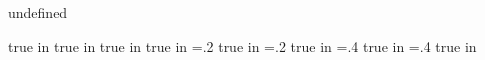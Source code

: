 \def\ifundefined#1{\expandafter\ifx\csname#1\endcsname\relax}
\def\ifdefined#1{\ifundefined{#1}\relax\else}
{\ifdefined{undefined}\fi}
\ifx\eplain\undefined  \fi 

\ifpdf
     true in
     true in
\fi
{} true in
 true in
\topmargin=.2 true in
\bottommargin=.2 true in
\leftmargin=.4 true in
\rightmargin=.4 true in

\makeatletter
\let\nobeamer@folio\folio
\def\disablepagenumbering{\def\folio{}}
\def\enablepagenumbering{\let\folio\nobeamer@folio}
\makeatother

\disablepagenumbering

\parindent=0pt


